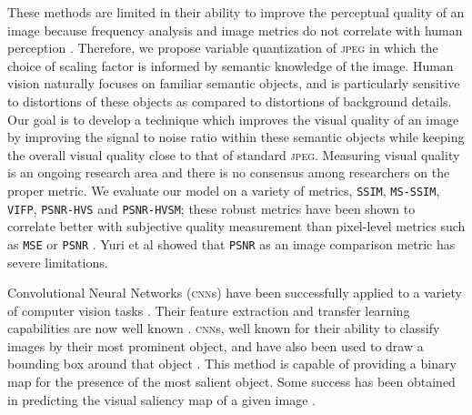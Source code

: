 These methods are limited in their ability to improve the perceptual quality of an image because frequency analysis and image metrics do not correlate with human perception \cite{klein1992relevance}.
Therefore, we propose variable quantization of \textsc{jpeg} in which the choice of scaling factor is informed by semantic knowledge of the image.
Human vision naturally focuses on familiar semantic objects, and is particularly sensitive to distortions of these objects as compared to distortions of background details.
Our goal is to develop a technique which improves the visual quality of an image by improving the signal to noise ratio within these semantic objects while keeping the overall visual quality close to that of standard \textsc{jpeg}. 
Measuring visual quality is an ongoing research area and there is no consensus among researchers on the proper metric. 
We evaluate our model on a variety of metrics, \texttt{SSIM}\cite{ssim}, \texttt{MS-SSIM}\cite{msssim}, \texttt{VIFP}\cite{vifp}, \texttt{PSNR-HVS}\cite{psnrhvs} and \texttt{PSNR-HVSM}\cite{psnrhvsm}; these robust metrics have been shown to correlate better with subjective quality measurement than pixel-level metrics such as \texttt{MSE} or \texttt{PSNR} \cite{psnrhvsm}.
Yuri et al \cite{kerofsky2015perceptual} showed that \texttt{PSNR} as an image comparison metric has severe limitations.

Convolutional Neural Networks (\textsc{cnn}s) have been successfully applied to a variety of computer vision tasks \cite{he2015deep} \cite{krizhevsky2012imagenet}.
Their feature extraction and transfer learning capabilities are now well known\cite{zeiler2014visualizing} .
\textsc{cnn}s, well known for their ability to classify images by their most prominent object, and have also been used to draw a bounding box around that object \cite{girshick2014rich}.
This method is capable of providing a binary map for the presence of the most salient object. Some success has been obtained in predicting the visual saliency map of a given image \cite{jiang2015salicon} \cite{kummerer2014deep}.

